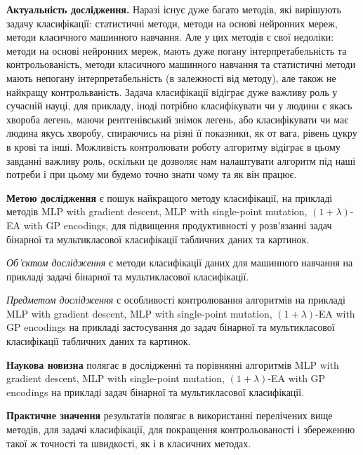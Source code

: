 \textbf{Актуальність дослідження.} Наразі існує дуже багато методів, які вирішують задачу класифікації: статистичні методи, методи на основі нейронних мереж, методи класичного машинного навчання. Але у цих методів є свої недоліки: методи на основі нейронних мереж, мають дуже погану інтерпретабельність та контрольованість, методи класичного машинного навчання та статистичні методи мають непогану інтерпретабельність (в залежності від методу), але також не найкращу контрольваність. Задача класифікації відіграє дуже важливу роль у сучасній науці, для прикладу, іноді потрібно класифікувати чи у людини є якась хвороба легень, маючи рентгенівський знімок легень, або класифікувати чи має людина якусь хворобу, спираючись на різні її показники, як от вага, рівень цукру в крові та інші. Можливість контролювати роботу алгоритму відіграє в цьому завданні важливу роль, оскільки це дозволяє нам налаштувати алгоритм під наші потреби і при цьому ми будемо точно знати чому та як він працює.

\textbf{Метою дослідження} є пошук найкращого методу класифікації, на прикладі методів MLP with gradient descent, MLP with single-point mutation, $(1+\lambda)$-EA with GP encodings, для підвищення продуктивності у розв'язанні задач бінарної та мультикласової класифікації табличних даних та картинок.

\emph{Об'єктом дослідження} є методи класифікації даних для машинного навчання на прикладі задачі бінарної та мультикласової класифікації.

\emph{Предметом дослідження} є особливості контролювання алгоритмів на прикладі MLP with gradient descent, MLP with single-point mutation, $(1+\lambda)$-EA with GP encodings на прикладі застосування до задач бінарної та мультикласової класифікації табличних даних та картинок.

\textbf{Наукова новизна} полягає в дослідженні та порівнянні алгоритмів MLP with gradient descent, MLP with single-point mutation, $(1+\lambda)$-EA with GP encodings на прикладі задач бінарної та мультикласової класифікації.

\textbf{Практичне значення} результатів полягає в використанні перелічених вище методів, для задачі класифікації, для покращення контрольованості і збереженню такої ж точності та швидкості, як і в класичних методах.